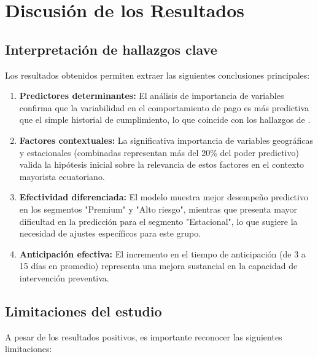 \section{Discusión de los Resultados}
\subsection{Interpretación de hallazgos clave}
Los resultados obtenidos permiten extraer las siguientes conclusiones principales:

\begin{enumerate}
    \item \textbf{Predictores determinantes:} El análisis de importancia de variables confirma que la variabilidad en el comportamiento de pago es más predictiva que el simple historial de cumplimiento, lo que coincide con los hallazgos de \cite{torres2023inteligencia}.
    
    \item \textbf{Factores contextuales:} La significativa importancia de variables geográficas y estacionales (combinadas representan más del 20\% del poder predictivo) valida la hipótesis inicial sobre la relevancia de estos factores en el contexto mayorista ecuatoriano.
    
    \item \textbf{Efectividad diferenciada:} El modelo muestra mejor desempeño predictivo en los segmentos "Premium" y "Alto riesgo", mientras que presenta mayor dificultad en la predicción para el segmento "Estacional", lo que sugiere la necesidad de ajustes específicos para este grupo.
    
    \item \textbf{Anticipación efectiva:} El incremento en el tiempo de anticipación (de 3 a 15 días en promedio) representa una mejora sustancial en la capacidad de intervención preventiva.
\end{enumerate}

\subsection{Limitaciones del estudio}
A pesar de los resultados positivos, es importante reconocer las siguientes limitaciones:

